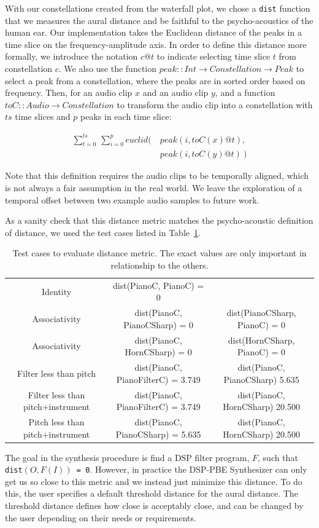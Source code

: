 With our constellations created from the waterfall plot, we chose a \texttt{dist} function that we measures the aural distance and be faithful to the psycho-acoustics of the human ear.
Our implementation takes the Euclidean distance of the peaks in a time slice on the frequency-amplitude axis.
In order to define this distance more formally, we introduce the notation $c@t$ to indicate selecting time slice $t$ from constellation $c$.
We also use the function $peak:: Int \to Constellation \to Peak$ to select a peak from a constellation, where the peaks are in sorted order based on frequency.
Then, for an audio clip $x$ and an audio clip $y$, and a function $toC :: Audio \to Constellation$ to transform the audio clip into a constellation with $ts$ time slices and $p$ peaks in each time slice:

\begin{align*}
\sum_{t=0}^{ts}\ \sum_{i=0}^{p} euclid\Big(\ &peak(i,toC(x)@t), \\ &peak(i,toC(y)@t)\ \Big)
\end{align*}

Note that this definition requires the audio clips to be temporally aligned, which is not always a fair assumption in the real world. We leave the exploration of a temporal offset between two example audio samples to future work.

As a sanity check that this distance metric matches the psycho-acoustic definition of distance, we used the test cases listed in Table~\ref{table:dist}.

\begin{table}[!h]
\centering
\begin{tabular}{|c || c | c|} 
 \hline
 Identity & dist(PianoC, PianoC) = 0 & \\ 
 Associativity & dist(PianoC, PianoCSharp) = 0 & dist(PianoCSharp, PianoC) = 0 \\
 Associativity & dist(PianoC, HornCSharp) = 0 & dist(HornCSharp, PianoC) = 0 \\
 Filter less than pitch & dist(PianoC, PianoFilterC) = 3.749 & dist(PianoC, PianoCSharp) 5.635 \\
 Filter less than pitch+instrument & dist(PianoC, PianoFilterC) = 3.749 & dist(PianoC, HornCSharp)  20.500 \\
 Pitch less than pitch+instrument & dist(PianoC, PianoCSharp) = 5.635 & dist(PianoC, HornCSharp)  20.500 \\
 \hline
\end{tabular}
\caption{Test cases to evaluate distance metric. The exact values are only important in relationship to the others.}
\label{table:dist}
\end{table}


The goal in the synthesis procedure is find a DSP filter program, $F$, such that \texttt{dist$(O, F(I))$ = 0}.
However, in practice the DSP-PBE Synthesizer can only get us so close to this metric and we instead just minimize this distance.
To do this, the user specifies a default threshold distance for the aural distance.
The threshold distance defines how close is acceptably close, and can be changed by the user depending on their needs or requirements.

